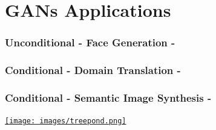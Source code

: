 \documentclass{beamer}
\begin{document}
\section{GANs Applications}



{
\begin{frame}
\frametitle{Unconditional - Face Generation - \cite{karrasProgressiveGrowingGANs2017}}
\end{frame}
}

{
\begin{frame}
\frametitle{Conditional - Domain Translation - \cite{isolaImagetoImageTranslationConditional2016a}}
\end{frame}
}


\begin{frame}
\frametitle{Conditional - Semantic Image Synthesis - \cite{parkSemanticImageSynthesis2019}}
\href{run:images/treepond.mp4?autostart&loop&noprogress}{\texttt{[image: images/treepond.png]}}
\end{frame}
\end{document}
